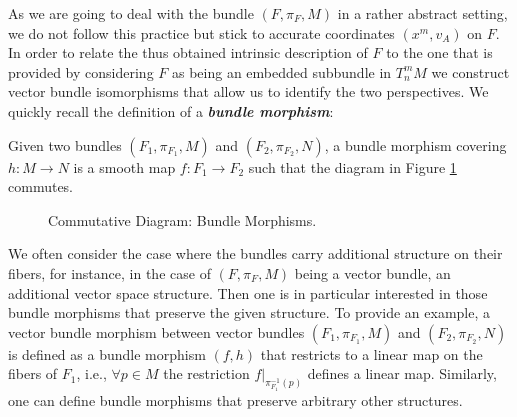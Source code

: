As we are going to deal with the bundle $(F, \pi_F, M)$ in a rather abstract setting, we do not follow this practice but stick to accurate coordinates $(x^m,v_A)$ on $F$. 
In order to relate the thus obtained intrinsic description of $F$ to the one that is provided by considering $F$ as being an embedded subbundle in $T^m_n M$ we construct vector bundle isomorphisms that allow us to identify the two perspectives. We quickly recall the definition of a \textit{\textbf{bundle morphism}}:
\begin{definition}
Given two bundles $(F_1, \pi_{F_1}, M)$ and $(F_2, \pi_{F_2}, N)$, a bundle morphism covering $h : M \rightarrow N$ is a smooth map $f : F_1 \rightarrow F_2$ such that the diagram in Figure \ref{BundleMorph} commutes.
\begin{figure}[hbt!]
\centering 
{}
\caption{Commutative Diagram: Bundle Morphisms.}\label{BundleMorph}
\end{figure}
\end{definition}
\begin{comment}
\begin{remark}
We normally denote a bundle morphism $f$ that covers $h$ as pair $(f,h)$. For the special case $M=N$ and $h=\mathrm{id}_M$ we shorten the notation to simply $f$. Also we might refer to a bundle morphism by the total space function $f$ if $f$ and $h$ are related via some specified construction, i.e., if $f$ can be obtained uniquely once $h$ is given. 
\end{remark}
\end{comment}
We often consider the case where the bundles carry additional structure on their fibers, for instance, in the case of $(F, \pi_F, M)$ being a vector bundle, an additional vector space structure. Then one is in particular interested in those bundle morphisms that preserve the given structure. To provide an example, a vector bundle morphism between vector bundles $(F_1, \pi_{F_1}, M)$ and $(F_2, \pi_{F_2}, N)$ is defined as a bundle morphism $(f,h)$ that restricts to a linear map on the fibers of $F_1$, i.e., $\forall p \in M$ the restriction $f \vert_{\pi_{F_1}^{-1}(p)}$ defines a linear map.
Similarly, one can define bundle morphisms that preserve arbitrary other structures.

